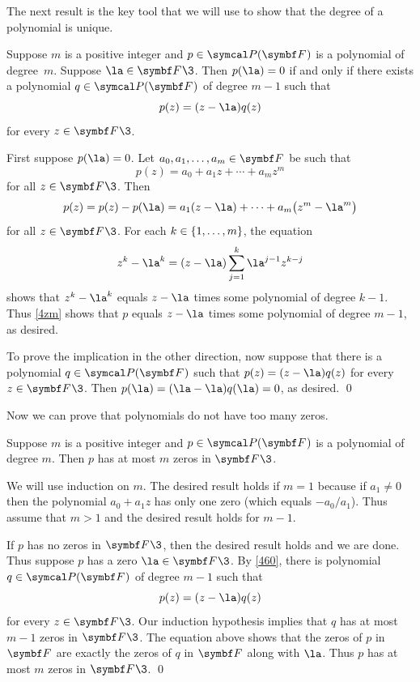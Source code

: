 The next result is the key tool that we will use to show that the degree of a polynomial is unique.

{Suppose $m$ is a positive integer and $p \in \P(\F{})$ is a polynomial of degree~$m$. Suppose $\la \in \F{}\3$. Then $p(\la) = 0$ if and only if there exists a polynomial $q \in \P(\F{})$ of degree $m-1$ such that
\[
p(z) = (z-\la)q(z)
\]
for every $z \in \F{}\3$.}

\proof
First suppose $p(\la) = 0$. Let $a_0, a_1, \ldots, a_m \in \F{}$ be such that
\[
p(z) = a_0 + a_1 z + \cdots + a_m z^m
\]
for all $z \in \F{}\3$. Then
\begin{equation} \label{4zm}
p(z) = p(z) - p(\la) = a_1(z-\la) + \cdots + a_m \paren[\big]{z^m - \la^m}
\end{equation}%
for all $z \in \F{}\3$. For each $k \in \{1, \ldots, m\}$, the equation
\[
z^k - \la^k =  (z - \la) \sum_{j=1}^{k} \la^{j-1} z^{k-j}
\]
shows that $z^k - \la^k$ equals $z - \la$ times some polynomial of degree $k-1$. Thus \ref{4zm} shows that $p$ equals $z - \la$ times some polynomial of degree $m-1$, as desired.

To prove the implication in the other direction, now suppose that there is a polynomial $q \in \P(\F{})$
such that $p(z) = (z - \la) q(z)$ for every $z \in \F{}\3$. Then $p(\la) = (\la - \la) q(\la) = 0$, as desired.
\qed

Now we can prove that polynomials do not have too many zeros.

{Suppose $m$ is a positive integer and $p \in \P(\F{})$ is a polynomial of degree $m$. Then $p$ has at most $m$ zeros in $\F{}\3$.}

\proof
We will use induction on $m$. The desired result holds if $m = 1$ because if $a_1 \ne 0$ then the polynomial $a_0 + a_1 z$ has only one zero (which equals $-a_0 / a_1$). Thus assume that $m > 1$ and the desired result holds for $m-1$.

If $p$ has no zeros in $\F{}\3$, then the desired result holds and we are done. Thus suppose $p$ has a zero $\la \in \F{}\3$. By \ref{460}, there is polynomial $q \in \P(\F{})$ of degree $m-1$ such that
\[
p(z) = (z - \la) q(z)
\]
for every $z \in \F{}\3$. Our induction hypothesis implies that $q$ has at most $m-1$ zeros in $\F{}\3$. The equation above shows that the zeros of $p$ in $\F{}$ are exactly the zeros of $q$ in $\F{}$ along with $\la$. Thus $p$ has at most $m$ zeros in $\F{}\3$.
\qed

